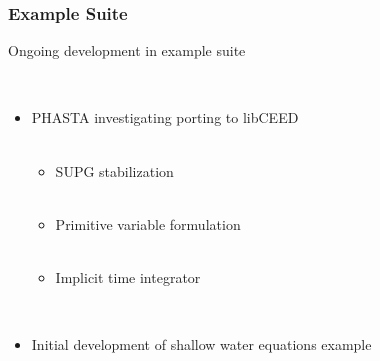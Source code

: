 \documentclass{beamer}
\begin{document}
\begin{frame}
\begin{center}
\frametitle{Example Suite}

{\flushleft
Ongoing development in example suite\\
}

~\\

\begin{itemize}

\item PHASTA investigating porting to libCEED\\

~\\

\begin{itemize}

\item SUPG stabilization\\

~\\

\item Primitive variable formulation\\

~\\

\item Implicit time integrator\\

\end{itemize}

~\\

\item Initial development of shallow water equations example

\end{itemize}

\end{center}
\end{frame}

\end{document}
